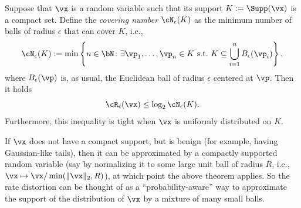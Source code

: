 \documentclass[../../book-main.tex]{subfiles}
\begin{document}
\begin{proposition}\label{prop:covering-number-rate-distortion}
	Suppose that \(\vx\) is a random variable such that its support \(K := \Supp(\vx)\) is a compact set. Define the \textit{covering number} \(\cN_{\epsilon}(K)\) as the minimum number of balls of radius \(\epsilon\) that can cover \(K\), i.e.,
	\begin{equation}
		\cN_{\epsilon}(K) := \min\left\{n \in \bN \colon \exists \vp_{1}, \dots, \vp_{n} \in K\ \text{s.t.}\ K \subseteq \bigcup_{i = 1}^{n}B_{\epsilon}(\vp_{i})\right\},
	\end{equation}
	where \(B_{\epsilon}(\vp)\) is, as usual, the Euclidean ball of radius \(\epsilon\) centered at \(\vp\).
	Then it holds 
	\begin{equation}
		\cR_{\epsilon}(\vx) \leq \log_{2} \cN_{\epsilon}(K).
	\end{equation}
	Furthermore, this inequality is tight when \(\vx\) is uniformly distributed on \(K\).
\end{proposition}
If \(\vx\) does not have a compact support, but is benign (for example, having Gaussian-like tails), then it can be approximated by a compactly supported random variable (say by normalizing it to some large unit ball of radius \(R\), i.e., \(\vx \mapsto \vx / \min(\|\vx\|_2, R)\)), at which point the above theorem applies. So the rate distortion can be thought of as a ``probability-aware'' way to approximate the support of the distribution of \(\vx\) by a mixture of many small balls.
\end{document}
